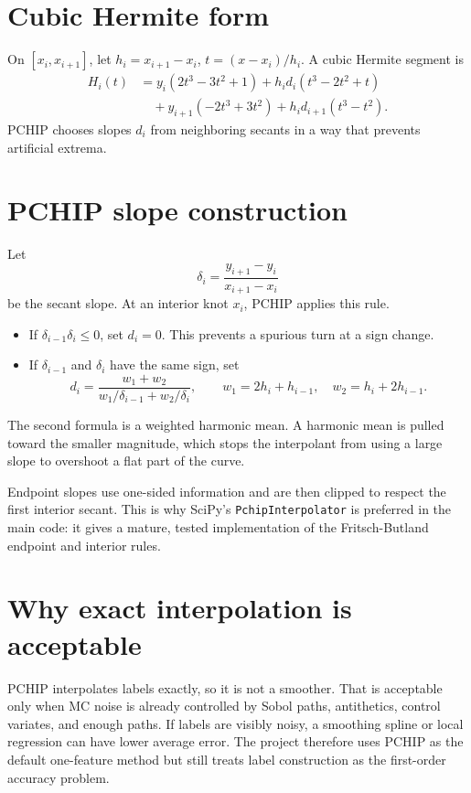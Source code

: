 \documentclass[11pt,oneside]{book}
\theoremstyle{definition}
\begin{document}
\section{Cubic Hermite form}
On \([x_i,x_{i+1}]\), let \(h_i=x_{i+1}-x_i\), \(t=(x-x_i)/h_i\). A cubic Hermite segment is
\[
\begin{aligned}
H_i(t)
&=y_i(2t^3-3t^2+1)
  +h_i d_i(t^3-2t^2+t)\\
&\quad
  +y_{i+1}(-2t^3+3t^2)
  +h_i d_{i+1}(t^3-t^2).
\end{aligned}
\]
PCHIP chooses slopes \(d_i\) from neighboring secants in a way that prevents artificial extrema.

\section{PCHIP slope construction}
Let
\[
  \delta_i=\frac{y_{i+1}-y_i}{x_{i+1}-x_i}
\]
be the secant slope. At an interior knot \(x_i\), PCHIP applies this rule.
\begin{itemize}
  \item If \(\delta_{i-1}\delta_i\le0\), set \(d_i=0\). This prevents a spurious turn at a sign change.
  \item If \(\delta_{i-1}\) and \(\delta_i\) have the same sign, set
  \[
    d_i=
    \frac{w_1+w_2}{w_1/\delta_{i-1}+w_2/\delta_i},
    \qquad
    w_1=2h_i+h_{i-1},\quad
    w_2=h_i+2h_{i-1}.
  \]
\end{itemize}
The second formula is a weighted harmonic mean. A harmonic mean is pulled toward the smaller magnitude, which stops the interpolant from using a large slope to overshoot a flat part of the curve.

Endpoint slopes use one-sided information and are then clipped to respect the first interior secant. This is why SciPy's \texttt{PchipInterpolator} is preferred in the main code: it gives a mature, tested implementation of the Fritsch-Butland endpoint and interior rules.

\section{Why exact interpolation is acceptable}
PCHIP interpolates labels exactly, so it is not a smoother. That is acceptable only when MC noise is already controlled by Sobol paths, antithetics, control variates, and enough paths. If labels are visibly noisy, a smoothing spline or local regression can have lower average error. The project therefore uses PCHIP as the default one-feature method but still treats label construction as the first-order accuracy problem.
\end{document}

